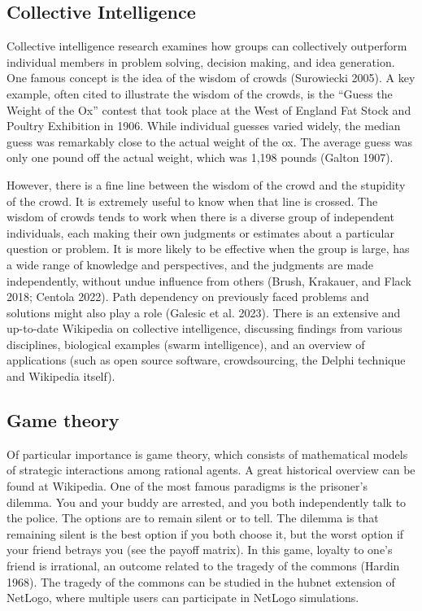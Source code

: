 \documentclass[
  a4paper,
  DIV=11,
  numbers=noendperiod,
  oneside]{scrreprt}
\begin{document}
\hypertarget{sec-Collective-Intelligence}{%
\subsection{Collective Intelligence}\label{sec-Collective-Intelligence}}

Collective intelligence research examines how groups can collectively
outperform individual members in problem solving, decision making, and
idea generation. One famous concept is the idea of the wisdom of crowds
(Surowiecki 2005). A key example, often cited to illustrate the wisdom
of the crowds, is the ``Guess the Weight of the Ox'' contest that took
place at the West of England Fat Stock and Poultry Exhibition in 1906.
While individual guesses varied widely, the median guess was remarkably
close to the actual weight of the ox. The average guess was only one
pound off the actual weight, which was 1,198 pounds (Galton 1907).

However, there is a fine line between the wisdom of the crowd and the
stupidity of the crowd. It is extremely useful to know when that line is
crossed. The wisdom of crowds tends to work when there is a diverse
group of independent individuals, each making their own judgments or
estimates about a particular question or problem. It is more likely to
be effective when the group is large, has a wide range of knowledge and
perspectives, and the judgments are made independently, without undue
influence from others (Brush, Krakauer, and Flack 2018; Centola 2022).
Path dependency on previously faced problems and solutions might also
play a role (Galesic et al. 2023). There is an extensive and up-to-date
Wikipedia on collective intelligence, discussing findings from various
disciplines, biological examples (swarm intelligence), and an overview
of applications (such as open source software, crowdsourcing, the Delphi
technique and Wikipedia itself).

\hypertarget{sec-Game-theory}{%
\subsection{Game theory}\label{sec-Game-theory}}

Of particular importance is game theory, which consists of mathematical
models of strategic interactions among rational agents. A great
historical overview can be found at Wikipedia. One of the most famous
paradigms is the prisoner's dilemma. You and your buddy are arrested,
and you both independently talk to the police. The options are to remain
silent or to tell. The dilemma is that remaining silent is the best
option if you both choose it, but the worst option if your friend
betrays you (see the payoff matrix). In this game, loyalty to one's
friend is irrational, an outcome related to the tragedy of the commons
(Hardin 1968). The tragedy of the commons can be studied in the hubnet
extension of NetLogo, where multiple users can participate in NetLogo
simulations.
\end{document}
